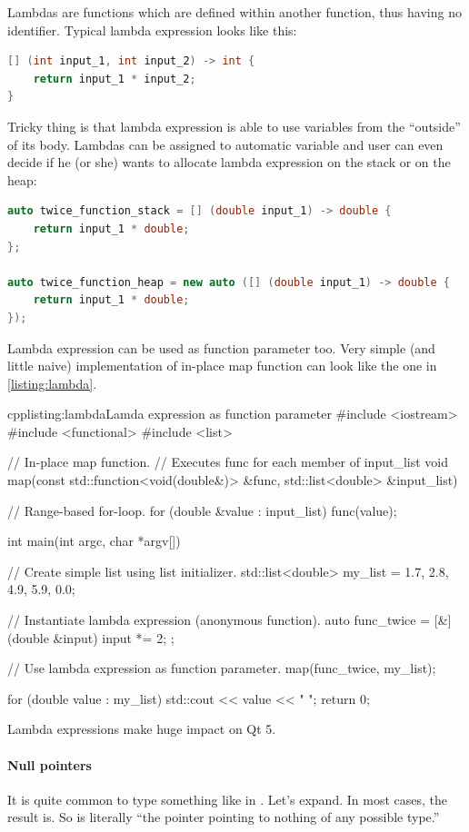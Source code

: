 Lambdas are functions which are defined within another function, thus having no identifier. Typical lambda expression looks like this:
\begin{lstlisting}[firstnumber=1,language=cpp]
[] (int input_1, int input_2) -> int {
	return input_1 * input_2;
}
\end{lstlisting}
Tricky thing is that lambda expression is able to use variables from the \enquote{outside} of its body. Lambdas can be assigned to automatic variable and user can even decide if he (or she) wants to allocate lambda expression on the stack or on the heap:
\begin{lstlisting}[firstnumber=1,language=cpp]
auto twice_function_stack = [] (double input_1) -> double {
	return input_1 * double;
};

auto twice_function_heap = new auto ([] (double input_1) -> double {
	return input_1 * double;
});
\end{lstlisting}
Lambda expression can be used as function parameter too. Very simple (and little naive) implementation of in-place map function can look like the one in \autoref{listing:lambda}.
\begin{fdoccode}{cpp}{listing:lambda}{Lamda expression as function parameter}
#include <iostream>
#include <functional>
#include <list>


// In-place map function.
// Executes func for each member of input_list
void map(const std::function<void(double&)> &func, std::list<double> &input_list) {

    // Range-based for-loop.
    for (double &value : input_list) {
		func(value);
    }
}

int main(int argc, char *argv[]) {
    // Create simple list using list initializer.
    std::list<double> my_list = {1.7, 2.8, 4.9, 5.9, 0.0};

    // Instantiate lambda expression (anonymous function).
    auto func_twice = [&] (double &input) {
		input *= 2;
    };

    // Use lambda expression as function parameter.
    map(func_twice, my_list);

    for (double value : my_list) {
		std::cout << value << " ";
    }
    return 0;
}
\end{fdoccode}
Lambda expressions make huge impact on Qt 5.

\paragraph*{Null pointers}
It is quite common to type something like in . Let's expand. In most cases, the result is. So is literally \enquote{the pointer pointing to nothing of any possible type.}

